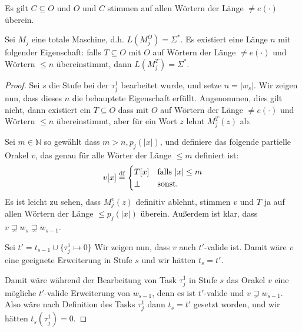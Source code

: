 \begin{claim}
    Es gilt $C\subseteq O$ und $O$ und $C$ stimmen auf allen Wörtern der Länge $\neq e(\cdot)$ überein.
\end{claim}


\begin{claim}
    Sei $M_j$ eine totale Maschine, d.h. $L(M_j^O)=\Sigma^*$.
    Es existiert eine Länge $n$ mit folgender Eigenschaft: 
    falls $T\subseteq O$ mit $O$ auf Wörtern der Länge $\neq e(\cdot)$ und Wörtern $\leq n$ übereinstimmt, dann $L(M_j^T)=\Sigma^*$.
\end{claim}
\begin{proof}
    Sei $s$ die Stufe bei der $\tau^1_j$ bearbeitet wurde, 
    und setze $n=|w_{s}|$.
    Wir zeigen nun, dass dieses $n$ die behauptete Eigenschaft erfüllt.
    Angenommen, dies gilt nicht, dann existiert ein $T\subseteq O$ dass mit $O$ auf Wörtern der Länge $\neq e(\cdot)$ und Wörtern $\leq n$ übereinstimmt, aber für ein Wort $z$ lehnt $M_j^T(z)$ ab.

    Sei $m\in\mathbb N$ so gewählt dass $m> n, p_j(|x|)$, und definiere das folgende partielle Orakel $v$, das genau für alle Wörter der Länge $\leq m$ definiert ist:
    \[ v[x] \stackrel{\text{df}}{=} \begin{cases} T[x] & \text{falls $|x|\leq m$} \\ \bot & \text{sonst}. \end{cases}\]
    Es ist leicht zu sehen, dass $M_j^v(z)$ definitiv ablehnt, stimmen $v$ und $T$ ja auf allen Wörtern der Länge $\leq p_j(|x|)$ überein.
    Außerdem ist klar, dass $v\sqsupsetneq w_s \sqsupsetneq w_{s-1}$.

    Sei $t'=t_{s-1}\cup \{\tau^1_j\mapsto 0\}$
    Wir zeigen nun, dass $v$ auch $t'$-valide ist. Damit wäre $v$ eine geeignete Erweiterung in Stufe $s$ und wir hätten $t_s=t'$. 



    Damit wäre während der Bearbeitung von Task $\tau^1_{j}$ in Stufe $s$ das Orakel $v$ eine mögliche $t'$-valide Erweiterung von $w_{s-1}$, denn es ist $t'$-valide und $v\sqsupsetneq w_{s-1}$. Also wäre nach Definition des Tasks $\tau^1_{j}$ dann $t_{s}=t'$ gesetzt worden,
    und wir hätten $t_s(\tau^1_j)=0$.


\end{proof}
